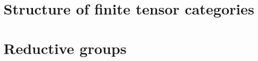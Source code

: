         
        
        
    
    \begin{appendices}
        \chapter{Structure of finite tensor categories}
            \begin{abstract}
            
            \end{abstract}
            
            \minitoc
        
            
            
            
            
        \chapter{Reductive groups}
            \begin{abstract}
                
            \end{abstract}
            
            \minitoc
            
            
        
            
            
            
            
            
            
            
        
    \end{appendices}
	
	\printbibliography

